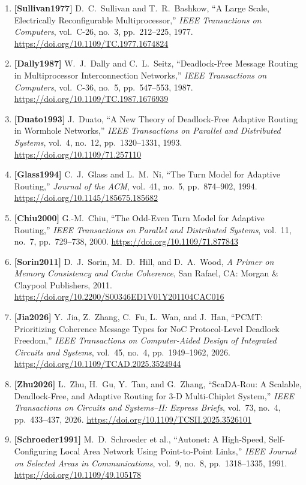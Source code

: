 \begin{enumerate}
    \item \textbf{[Sullivan1977]} D.~C.~Sullivan and T.~R.~Bashkow, ``A Large Scale, Electrically Reconfigurable Multiprocessor,'' \emph{IEEE Transactions on Computers}, vol.~C-26, no.~3, pp.~212--225, 1977. \url{https://doi.org/10.1109/TC.1977.1674824}
    \item \textbf{[Dally1987]} W.~J.~Dally and C.~L.~Seitz, ``Deadlock-Free Message Routing in Multiprocessor Interconnection Networks,'' \emph{IEEE Transactions on Computers}, vol.~C-36, no.~5, pp.~547--553, 1987. \url{https://doi.org/10.1109/TC.1987.1676939}
    \item \textbf{[Duato1993]} J.~Duato, ``A New Theory of Deadlock-Free Adaptive Routing in Wormhole Networks,'' \emph{IEEE Transactions on Parallel and Distributed Systems}, vol.~4, no.~12, pp.~1320--1331, 1993. \url{https://doi.org/10.1109/71.257110}
    \item \textbf{[Glass1994]} C.~J.~Glass and L.~M.~Ni, ``The Turn Model for Adaptive Routing,'' \emph{Journal of the ACM}, vol.~41, no.~5, pp.~874--902, 1994. \url{https://doi.org/10.1145/185675.185682}
    \item \textbf{[Chiu2000]} G.-M.~Chiu, ``The Odd-Even Turn Model for Adaptive Routing,'' \emph{IEEE Transactions on Parallel and Distributed Systems}, vol.~11, no.~7, pp.~729--738, 2000. \url{https://doi.org/10.1109/71.877843}
    \item \textbf{[Sorin2011]} D.~J.~Sorin, M.~D.~Hill, and D.~A.~Wood, \emph{A Primer on Memory Consistency and Cache Coherence}, San Rafael, CA: Morgan \& Claypool Publishers, 2011. \url{https://doi.org/10.2200/S00346ED1V01Y201104CAC016}
    \item \textbf{[Jia2026]} Y.~Jia, Z.~Zhang, C.~Fu, L.~Wan, and J.~Han, ``PCMT: Prioritizing Coherence Message Types for NoC Protocol-Level Deadlock Freedom,'' \emph{IEEE Transactions on Computer-Aided Design of Integrated Circuits and Systems}, vol.~45, no.~4, pp.~1949--1962, 2026. \url{https://doi.org/10.1109/TCAD.2025.3524944}
    \item \textbf{[Zhu2026]} L.~Zhu, H.~Gu, Y.~Tan, and G.~Zhang, ``ScaDA-Rou: A Scalable, Deadlock-Free, and Adaptive Routing for 3-D Multi-Chiplet System,'' \emph{IEEE Transactions on Circuits and Systems--II: Express Briefs}, vol.~73, no.~4, pp.~433--437, 2026. \url{https://doi.org/10.1109/TCSII.2025.3526101}
    \item \textbf{[Schroeder1991]} M.~D.~Schroeder et al., ``Autonet: A High-Speed, Self-Configuring Local Area Network Using Point-to-Point Links,'' \emph{IEEE Journal on Selected Areas in Communications}, vol.~9, no.~8, pp.~1318--1335, 1991. \url{https://doi.org/10.1109/49.105178}

\end{enumerate}
